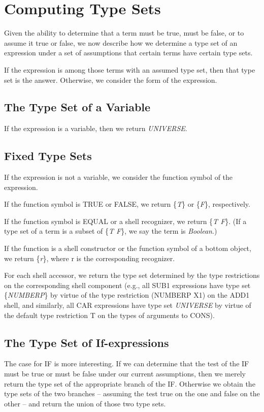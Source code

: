 \documentclass[10pt]{book}
\begin{document}
\section{Computing Type Sets}
Given the ability to determine that a term must be true, must be false,
or to assume it true or false, we now describe how we determine a type
set of an expression
under a set of assumptions that certain terms have
certain type sets.

If the expression is among those terms
with an assumed type set, then that type set is the answer.  Otherwise, we
consider the form of the expression.  

\subsection{The Type Set of a Variable}
If the expression is a variable, then we return \emph{UNIVERSE}.

\subsection{Fixed Type Sets}
If the expression is not a variable, we consider the function
symbol of the expression.

If the function symbol is TRUE or FALSE, we return \{\emph{T}\} or \{\emph{F}\}, respectively.

If the function symbol is EQUAL or a shell recognizer,
we return \{\emph{T F}\}.  (If a type set of a term is a subset of \{\emph{T F}\}, we say
the term is \emph{Boolean}.)

If the function is a  shell constructor or the function symbol
of a  bottom object, we return \{\emph{r}\}, 
where r is the corresponding recognizer.

For each shell accessor, we return the type set determined by the
type restrictions on the corresponding shell component (e.g., all SUB1
expressions have type set \{\emph{NUMBERP}\} by virtue of the type restriction
(NUMBERP X1)
on the ADD1 shell, and similarly, all CAR expressions have type set \emph{UNIVERSE}
by virtue of the default type restriction T on the types of arguments to CONS).

\subsection{The Type Set of If-expressions}
The case for IF is more interesting.  If we can determine that the test of the IF must be true
or must be false under our current assumptions, then we 
merely return the type set of the appropriate branch of the IF.
Otherwise we  obtain the
type sets of the two branches -- assuming the test true on the one and
false on the other -- and return the union of those two type sets.
\end{document}
